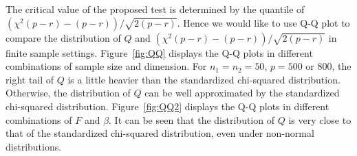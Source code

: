 \documentclass[3p]{elsarticle}
\theoremstyle{plain}
\theoremstyle{definition}
\theoremstyle{remark}
\begin{document}
The critical value of the proposed test is determined by the quantile of $(\chi^2(p-r)-(p-r))/\sqrt{2(p-r)}$.
Hence we would like to use Q-Q plot to compare the distribution of $Q$ and $(\chi^2(p-r)-(p-r))/\sqrt{2(p-r)}$ in finite sample settings.
Figure~\ref{fig:QQ} displays the Q-Q plots in different combinations of sample size and dimension.
For $n_1=n_2=50$, $p=500$ or $800$, the right tail of $Q$ is a little heavier than the standardized chi-squared distribution.
Otherwise, the distribution of $Q$ can be well approximated by the standardized chi-squared distribution.
Figure~\ref{fig:QQ2} displays the Q-Q plots in different combinations of $F$ and $\beta$.
It can be seen that the distribution of $Q$ is very close to that of the standardized chi-squared distribution, even under non-normal distributions.
\end{document}
